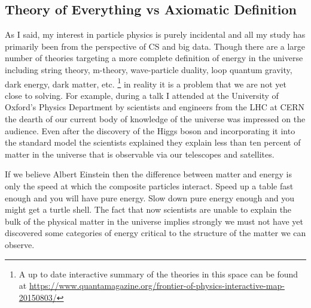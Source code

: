 \subsection{Theory of Everything vs Axiomatic Definition}

As I said, my interest in particle physics is purely incidental and all my study has primarily been from the perspective of CS and big data. Though there are a large number of theories targeting a more complete definition of energy in the universe including string theory, m-theory, wave-particle duality, loop quantum gravity, dark energy, dark matter, etc. \footnote{A up to date interactive summary of the theories in this space can be found at \url{https://www.quantamagazine.org/frontier-of-physics-interactive-map-20150803/}} in reality it is a problem that we are not yet close to solving. For example, during a talk I attended at the University of Oxford's Physics Department by scientists and engineers from the LHC at CERN the dearth of our current body of knowledge of the universe was impressed on the audience. Even after the discovery of the Higgs boson and incorporating it into the standard model the scientists explained they explain less than ten percent of matter in the universe that is observable via our telescopes and satellites. 

If we believe Albert Einstein then the difference between matter and energy is only the speed at which the composite particles interact. Speed up a table fast enough and you will have pure energy. Slow down pure energy enough and you might get a turtle shell. The fact that now scientists are unable to explain the bulk of the physical matter in the universe implies strongly we must not have yet discovered some categories of energy critical to the structure of the matter we can observe. 

\begin{comment}
As I began to think about the problem more I was struck by the religious connotations inherent in a theory of everything. Beyond a purely semantic logical inclusion ? a theory of everything should include religion ? the problem of course strikes at the core of ancient idea about God. My parents were converted Jews and I was born and raised in an independent religious sect. As devout Christians, my parents raised me to believe that God was an all powerful consciousness. God?s definition was an eternal energy that was at all times omnipresent, in every possible place at the same time, omniscient, contained all knowledge, and omnipotent, an all powerful creature. If I were religious I would in essence by exploring theories of my childhood idea of a God. However I am not religious by nature and in any case God is hardly considered a satisfying and complete scientific solution. 

In lieu of relying on God, or gods, humans have satisfied our endless curiosity using numbers and functions.
\end{comment}

